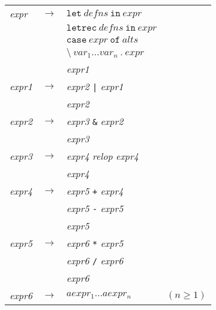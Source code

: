 \documentclass{jarticle}
\begin{document}
\begin{center}
	\begin{tabular} {l c l l}
		\textit{expr}  & $\rightarrow$ & $\texttt{let} ~ defns ~ \texttt{in} ~ expr$                        &              \\
		               & \textbar      & $\texttt{letrec} ~ defns ~ \texttt{in} ~ expr$                     &              \\
		               & \textbar      & $\texttt{case} ~ expr ~ \texttt{of} ~ alts$                        &              \\
		               & \textbar      & $\texttt{\textbackslash} ~ var_1 \ldots var_n ~ \texttt{.} ~ expr$ &              \\
		               & \textbar      & \textit{expr1}                                                     &              \\
		\textit{expr1} & $\rightarrow$ & \textit{expr2} \texttt{|} \textit{expr1}                           &              \\
		               & \textbar      & \textit{expr2}                                                     &              \\
		\textit{expr2} & $\rightarrow$ & \textit{expr3} \texttt{\&} \textit{expr2}                          &              \\
		               & \textbar      & \textit{expr3}                                                     &              \\
		\textit{expr3} & $\rightarrow$ & \textit{expr4} \textit{relop} \textit{expr4}                       &              \\
		               & \textbar      & \textit{expr4}                                                     &              \\
		\textit{expr4} & $\rightarrow$ & \textit{expr5} \texttt{+} \textit{expr4}                           &              \\
		               & \textbar      & \textit{expr5} \texttt{-} \textit{expr5}                           &              \\
		               & \textbar      & \textit{expr5}                                                     &              \\
		\textit{expr5} & $\rightarrow$ & \textit{expr6} \texttt{*} \textit{expr5}                           &              \\
		               & \textbar      & \textit{expr6} \texttt{/} \textit{expr6}                           &              \\
		               & \textbar      & \textit{expr6}                                                     &              \\
		\textit{expr6} & $\rightarrow$ & $aexpr_1 \ldots aexpr_n$                                           & $(n \geq 1)$ \\
	\end{tabular}
\end{center}
\end{document}
